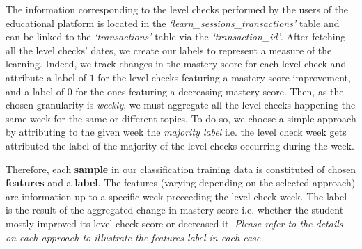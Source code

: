 \documentclass[sigplan,screen]{acmart}
\begin{document}
The information corresponding to the level checks performed by the users of the educational platform is located in the \emph{`learn\_sessions\_transactions'} table and can be linked to the \emph{`transactions'} table via the \emph{`transaction\_id'}. After fetching all the level checks' dates, we create our labels to represent a measure of the learning. Indeed, we track changes in the mastery score for each level check and attribute a label of $1$ for the level checks featuring a mastery score improvement, and a label of $0$ for the ones featuring a decreasing mastery score. Then, as the chosen granularity is \textit{weekly}, we must aggregate all the level checks happening the same week for the same or different topics. To do so, we choose a simple approach by attributing to the given week the \textit{majority label} i.e. the level check week gets attributed the label of the majority of the level checks occurring during the week.

Therefore, each \textbf{sample} in our classification training data is constituted of chosen \textbf{features} and a \textbf{label}. The features (varying depending on the selected approach) are information up to a specific week preceeding the level check week. The label is the result of the aggregated change in mastery score i.e. whether the student mostly improved its level check score or decreased it. \textit{Please refer to the details on each approach to illustrate the features-label in each case.}
\end{document}
